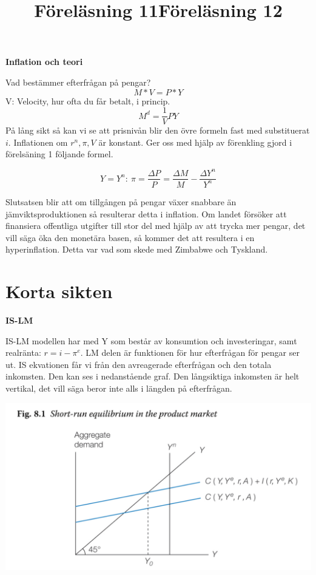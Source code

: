 \documentclass{article}
\begin{document}
\vspace{5mm}
\title{Föreläsning 11}
\vspace{5mm} \par \noindent 

\textbf{Inflation och teori} \par \noindent \vspace{5mm}

Vad bestämmer efterfrågan på pengar? 
$$
M*V = P*Y 
$$
V: Velocity, hur ofta du får betalt, i princip. 
$$
M^d = \frac{1}{V} PY
$$
På lång sikt så kan vi se att prisnivån blir den övre formeln fast med substituerat $ i$. Inflationen om $r^n, \pi, V$ är konstant. Ger oss med hjälp av förenkling gjord i förelsäning 1 följande formel. 

$$ 
Y = Y^n: \ \pi = \frac{\Delta P }{P} = \frac{\Delta M}{M} - \frac{\Delta Y^n}{Y^n}
$$

Slutsatsen blir att om tillgången på pengar växer snabbare än jämviktsproduktionen så resulterar detta i inflation. Om landet försöker att finansiera offentliga utgifter till stor del med hjälp av att trycka mer pengar, det vill säga öka den monetära basen, så kommer det att resultera i en hyperinflation. Detta var vad som skede med Zimbabwe och Tyskland.  \par \noindent \vspace{5mm} 

\section{Korta sikten}
\vspace{5mm}
\title{Föreläsning 12}
\vspace{5mm} \par \noindent 

\textbf{IS-LM}
\vspace{5mm} \par \noindent 

IS-LM modellen har med Y som består av konsumtion och investeringar, samt realränta: $ r = i-\pi^e$. LM delen är funktionen för hur efterfrågan för pengar ser ut. IS ekvationen får vi från den avreagerade efterfrågan och den totala inkomsten. Den kan ses i nedanstående graf. Den långsiktiga inkomsten är helt vertikal, det vill säga beror inte alls i längden på efterfrågan. 

\includegraphics[scale=0.5]{skarm6} \vspace{5mm} \par \noindent 
\end{document}
